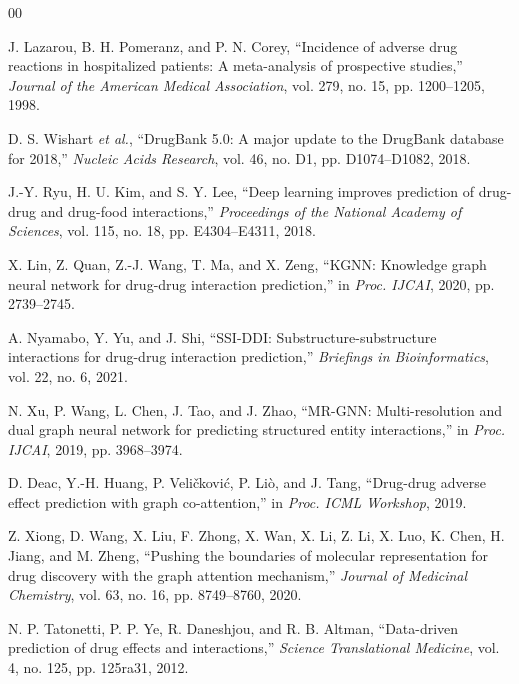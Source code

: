\documentclass[conference]{IEEEtran}
\begin{document}
\begin{thebibliography}{00}

J. Lazarou, B. H. Pomeranz, and P. N. Corey, ``Incidence of adverse drug reactions in hospitalized patients: A meta-analysis of prospective studies,'' \textit{Journal of the American Medical Association}, vol. 279, no. 15, pp. 1200--1205, 1998.

D. S. Wishart \textit{et al.}, ``DrugBank 5.0: A major update to the DrugBank database for 2018,'' \textit{Nucleic Acids Research}, vol. 46, no. D1, pp. D1074--D1082, 2018.

J.-Y. Ryu, H. U. Kim, and S. Y. Lee, ``Deep learning improves prediction of drug-drug and drug-food interactions,'' \textit{Proceedings of the National Academy of Sciences}, vol. 115, no. 18, pp. E4304--E4311, 2018.

X. Lin, Z. Quan, Z.-J. Wang, T. Ma, and X. Zeng, ``KGNN: Knowledge graph neural network for drug-drug interaction prediction,'' in \textit{Proc. IJCAI}, 2020, pp. 2739--2745.

A. Nyamabo, Y. Yu, and J. Shi, ``SSI-DDI: Substructure-substructure interactions for drug-drug interaction prediction,'' \textit{Briefings in Bioinformatics}, vol. 22, no. 6, 2021.

N. Xu, P. Wang, L. Chen, J. Tao, and J. Zhao, ``MR-GNN: Multi-resolution and dual graph neural network for predicting structured entity interactions,'' in \textit{Proc. IJCAI}, 2019, pp. 3968--3974.

D. Deac, Y.-H. Huang, P. Veli\v{c}kovi\'{c}, P. Li\`{o}, and J. Tang, ``Drug-drug adverse effect prediction with graph co-attention,'' in \textit{Proc. ICML Workshop}, 2019.

Z. Xiong, D. Wang, X. Liu, F. Zhong, X. Wan, X. Li, Z. Li, X. Luo, K. Chen, H. Jiang, and M. Zheng, ``Pushing the boundaries of molecular representation for drug discovery with the graph attention mechanism,'' \textit{Journal of Medicinal Chemistry}, vol. 63, no. 16, pp. 8749--8760, 2020.

N. P. Tatonetti, P. P. Ye, R. Daneshjou, and R. B. Altman, ``Data-driven prediction of drug effects and interactions,'' \textit{Science Translational Medicine}, vol. 4, no. 125, pp. 125ra31, 2012.


\end{thebibliography}
\end{document}
